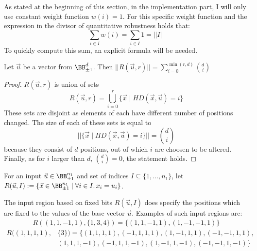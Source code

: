 As stated at the beginning of this section, in the implementation part,
I will only use constant weight function $w(i) = 1$. For this specific
weight function and the expression in the divisor of quantitative robustness
holds that:
\[\sum_{i\in I} w(i) = \sum_{i\in I} 1 = ||I||\]
To quickly compute this sum, an explicit formula will be needed.\pagebreak

\begin{lemma}{Let $\vec u$ be a vector from $\BB^{d}_{\pm 1}$.
    Then $||R(\vec u, r)|| = \sum_{i=0}^{\min(r, d)} {d\choose i}$}%
    \label{lemma:size_of_hamming}%
    \begin{proof}
        $R(\vec u, r)$ is union of sets
        \begin{equation*}
            R(\vec u, r) = \bigcup_{i=0}^{r} \{\vec x \mid HD(\vec x, \vec u) = i\}
        \end{equation*}
        These sets are disjoint as elements of each have different number
        of positions changed. The size of each of these sets is equal to
        \begin{equation*}
            ||\{\vec x \mid HD(\vec x, \vec u) = i\}|| = {d\choose i}
        \end{equation*}
        because they consist of $d$ positions, out of which $i$ are choosen to be altered.
        Finally, as for $i$ larger than $d$, ${d\choose i}=0$, the statement holds.
    \end{proof}
\end{lemma}

\begin{definition}
    For an input $\vec u\in \BB^{n_1}_{\pm 1}$ and set of indices $I \subseteq \{1,\ldots,n_1\}$, let
    $R(\vec u, I) := \{\vec x\in \BB^{n_1}_{\pm 1} \mid \forall i\in I.\, x_i = u_i \}$.
\end{definition}

The input region based on fixed bits $R(\vec u, I)$ does specify
the positions which are fixed to the values of the base vector $\vec u$.
Examples of such input regions are:
\begin{align*}
    R((1,1,-1,1), \{1,3,4\}) = \{(1,1,-1,1), (1,-1,-1,1)\}
\end{align*}
\begin{align*}
    R((1,1,1,1), &\{3\}) = \{(1,1,1,1), (-1,1,1,1), (1,-1,1,1), (-1,-1,1,1),\\
    &(1,1,1,-1), (-1,1,1,-1), (1,-1,1,-1), (-1,-1,1,-1)\}\\
\end{align*}

